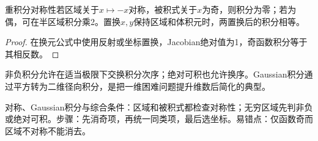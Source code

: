 \begin{theorem}{重积分对称性}若区域关于$x\mapsto-x$对称，被积式关于$x$为奇，则积分为零；若为偶，可在半区域积分乘2。置换$x,y$保持区域和体积元时，两置换后的积分相等。\end{theorem}
\begin{proof}在换元公式中使用反射或坐标置换，Jacobian绝对值为1，奇函数积分等于其相反数。\end{proof}
\begin{extension}非负积分允许在适当极限下交换积分次序；绝对可积也允许换序。Gaussian积分通过平方转为二维径向积分，是把一维困难问题提升维数后简化的典型。\end{extension}

\begin{method}{对称、Gaussian积分与综合}条件：区域和被积式都检查对称性；无穷区域先判非负或绝对可积。步骤：先消奇项，再统一同类项，最后选坐标。易错点：仅函数奇而区域不对称不能消去。\end{method}
